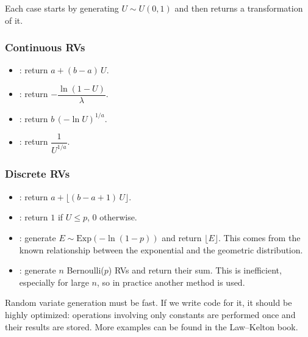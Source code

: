 Each case starts by generating $U \sim U(0,1)$ and then returns a transformation of it.

\subsubsection{Continuous RVs}
\begin{itemize}
\item {}: return $a + (b-a)\,U$.
\item {}: return $-\dfrac{\ln(1-U)}{\lambda}$.
\item {}: return $b\,(-\ln U)^{1/a}$.
\item {}: return $\dfrac{1}{U^{1/a}}$.
\end{itemize}

\subsubsection{Discrete RVs}
\begin{itemize}
\item {}: return $a + \lfloor (b-a+1)\,U \rfloor$.
\item {}: return $1$ if $U \le p$, $0$ otherwise.
\item {}: generate $E \sim \mathrm{Exp}(-\ln(1-p))$ and return $\lfloor E \rfloor$. This comes from the known relationship between the exponential and the geometric distribution.
\item {}: generate $n$ Bernoulli($p$) RVs and return their sum. This is inefficient, especially for large $n$, so in practice another method is used.
\end{itemize}

\begin{remark}
Random variate generation must be fast. If we write code for it, it should be highly optimized: operations involving only constants are performed once and their results are stored. More examples can be found in the Law--Kelton book.
\end{remark}
